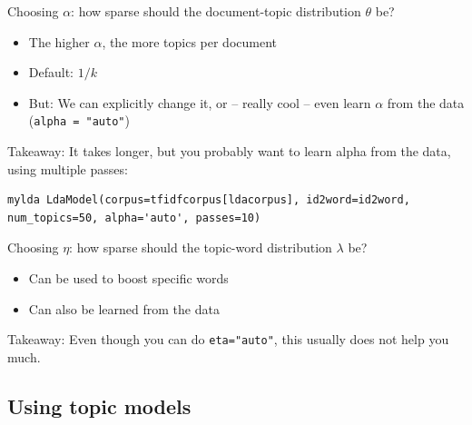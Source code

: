 \documentclass[compress]{beamer}
\begin{document}
\begin{frame}[fragile]{Choosing $\alpha$: how sparse should the document-topic distribution $\theta$ be?}
\begin{itemize}
	\item The higher $\alpha$, the more topics per document 
	\item Default: $1/k$
	\item But: We can explicitly change it, or -- really cool -- even learn $\alpha$ from the data (\texttt{alpha = "auto"})
\end{itemize}

\pause 

Takeaway: It takes longer, but you probably want to learn alpha from the data, using multiple passes:

\begin{lstlisting}
mylda LdaModel(corpus=tfidfcorpus[ldacorpus], id2word=id2word, num_topics=50, alpha='auto', passes=10)
\end{lstlisting}


\end{frame}


\begin{frame}{Choosing $\eta$: how sparse should the topic-word distribution $\lambda$ be?}
\begin{itemize}
	\item Can be used to boost specific words
	\item Can also be learned from the data 
\end{itemize}

\pause
Takeaway: Even though you can do \texttt{eta="auto"}, this usually does not help you much.

\end{frame}




\subsection{Using topic models}
\end{document}
